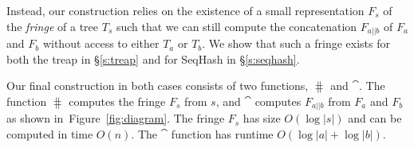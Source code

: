 Instead, our construction relies on the existence of a small representation
$F_s$ of the \emph{fringe} of a tree $T_s$ such that we can still compute the
concatenation $F_{a||b}$ of $F_a$ and $F_b$ without access to either $T_a$ or
$T_b$. We show that such a fringe exists for both the treap in \S\ref{s:treap}
and for SeqHash in \S\ref{s:seqhash}.

Our final construction in both cases consists of two functions, $\hash$ and
$\cat$. The function $\hash$ computes the fringe $F_s$ from $s$, and $\cat$
computes $F_{a||b}$ from $F_a$ and $F_b$ as shown in~Figure~\ref{fig:diagram}.
The fringe $F_s$ has size $O(\log |s|)$ and can be computed in time $O(n)$. The
$\cat$ function has runtime $O(\log |a| + \log |b|)$.



